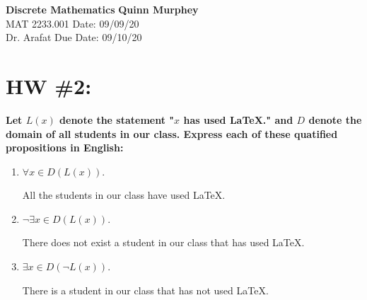 \documentclass[letterpaper, 12pt]{article}
\begin{document}
\noindent\large\textbf{Discrete Mathematics} \hfill \textbf{Quinn Murphey} \\
\normalsize MAT 2233.001 \hfill Date: 09/09/20 \\
Dr. Arafat \hfill Due Date: 09/10/20 \\

\noindent\makebox[\linewidth]{\rule{\paperwidth}{0.4pt}}

\section*{HW \#2:}
\textbf{Let $L(x)$ denote the statement "$x$ has used LaTeX." and $D$ denote the domain of all students in our class. Express each of these quatified propositions in English:}
\begin{enumerate}
    \item $\forall x\in D (L(x))$.
    
        All the students in our class have used LaTeX.
    
    \item $\lnot\exists x\in D (L(x))$.
    
        There does not exist a student in our class that has used LaTeX.
    
    \item $\exists x\in D (\lnot L(x))$.
    
        There is a student in our class that has not used LaTeX.
\end{enumerate}
\end{document}
